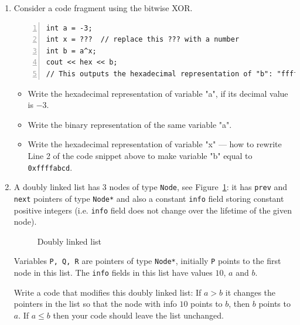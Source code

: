 \documentclass[a4paper,12pt]{article}
\begin{document}
\begin{enumerate}

\item 

Consider a code fragment using the bitwise XOR.

\begin{Verbatim}[frame=single,numbers=left]
int a = -3;
int x = ???  // replace this ??? with a number
int b = a^x;
cout << hex << b;
// This outputs the hexadecimal representation of "b": "ffffabcd".
\end{Verbatim}


\begin{itemize}
\item Write the hexadecimal representation of variable "a", if its decimal value is $-3$.
\item Write the binary representation of the same variable "a".
\item Write the hexadecimal representation of variable "x" --- how to rewrite Line 2 of the 
code snippet above to make variable "b" equal to {\tt 0xffffabcd}. 
\end{itemize}



\item 

A doubly linked list has 3 nodes of type {\tt Node}, see Figure~\ref{fig:nodes}: 
it has {\tt prev} and {\tt next} pointers of type {\tt Node*} 
and also a constant {\tt info} field storing constant positive integers 
(i.e. {\tt info} field does not change over the lifetime of the given node). 

\begin{figure}[!htb]
\caption{\label{fig:nodes} Doubly linked list}
\end{figure}

Variables {\tt P, Q, R} are pointers of type {\tt Node*}, 
initially {\tt P} points to the first node in this list. 
The {\tt info} fields in this list have values $10$, $a$ and $b$. 

Write a code that modifies this doubly linked list: If $a > b$ 
it changes the pointers in the list so that the node with info $10$
points to $b$, then $b$ points to $a$.
If $a \leq b$ then your code should leave the list unchanged.




\end{enumerate}
\end{document}
